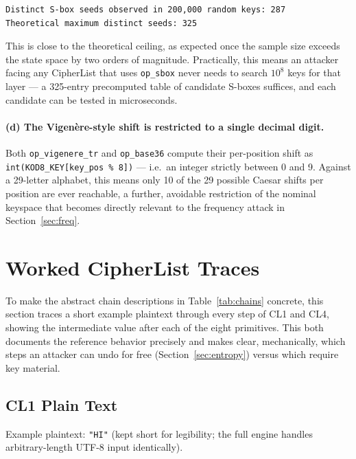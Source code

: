 \documentclass[11pt]{article}
\begin{document}
\begin{lstlisting}
Distinct S-box seeds observed in 200,000 random keys: 287
Theoretical maximum distinct seeds: 325
\end{lstlisting}

\noindent
This is close to the theoretical ceiling, as expected once the sample
size exceeds the state space by two orders of magnitude. Practically,
this means an attacker facing any CipherList that uses \texttt{op\_sbox}
never needs to search $10^{8}$ keys for that layer --- a 325-entry
precomputed table of candidate S-boxes suffices, and each candidate can
be tested in microseconds.

\paragraph{(d) The Vigen\`ere-style shift is restricted to a single decimal digit.}
Both \texttt{op\_vigenere\_tr} and \texttt{op\_base36} compute their
per-position shift as \texttt{int(KOD8\_KEY[key\_pos \% 8])} --- i.e.\ an
integer strictly between 0 and 9. Against a 29-letter alphabet, this
means only 10 of the 29 possible Caesar shifts per position are ever
reachable, a further, avoidable restriction of the nominal keyspace that
becomes directly relevant to the frequency attack in
Section~\ref{sec:freq}.

\section{Worked CipherList Traces}
\label{sec:traces}

To make the abstract chain descriptions in Table~\ref{tab:chains}
concrete, this section traces a short example plaintext through every
step of CL1 and CL4, showing the intermediate value after each of the
eight primitives. This both documents the reference behavior precisely
and makes clear, mechanically, which steps an attacker can undo for
free (Section~\ref{sec:entropy}) versus which require key material.

\subsection{CL1 Plain Text}

Example plaintext: \texttt{"HI"} (kept short for legibility; the
full engine handles arbitrary-length UTF-8 input identically).
\end{document}
